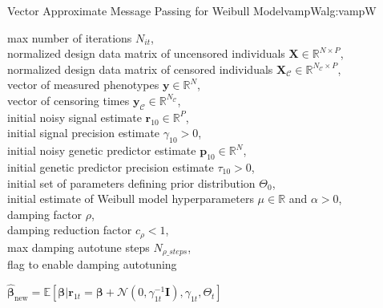 \begin{breakablealgorithm}{Vector Approximate Message Passing for Weibull Model}{vampW}{alg:vampW}
    \begin{algorithmic}[1]
     max number of iterations $N_{it}$, \\ 
    normalized design data matrix of uncensored individuals $\boldsymbol{X} \in \mathbb{R}^{N \times P}$, \\
    normalized design data matrix of censored individuals $\bm{X}_{\mathcal{C}} \in \mathbb{R}^{N_{\mathcal{C}} \times P}$, \\
    vector of measured phenotypes $\bm{y} \in \mathbb{R}^N$, \\
    vector of censoring times $\bm{y}_{\mathcal{C}} \in \mathbb{R}^{N_{\mathcal{C}}}$,\\
    initial noisy signal estimate $\bm{r}_{10} \in \mathbb{R}^P$, 
    \\ 
    initial signal precision estimate $\gamma_{10} > 0$, \\ 
    initial noisy genetic predictor estimate $\bm{p}_{10} \in \mathbb{R}^N$,
    \\ 
    initial genetic predictor precision estimate $\tau_{10} > 0$, \\
    initial set of parameters defining prior distribution $\Theta_{0}$, \\ 
    initial estimate of Weibull model hyperparameters $\mu \in\mathbb{R}$ and $\alpha > 0$,\\ 
    damping factor $\rho$, \\
    damping reduction factor $c_{\rho} < 1$, \\
    max damping autotune steps $N_{\rho\_steps}$, \\
    flag to enable damping autotuning
        
        \STATE $\hat{\bm{\beta}}_{\text{new}} = \mathbb{E}[\bm{\beta} | \bm{r}_{1t} = \bm{\beta} + \mathcal{N}(0, \gamma_{1t}^{-1}\bm{I}), \gamma_{1t}, \Theta_{t}]$
        

\end{algorithmic}
\end{breakablealgorithm}
